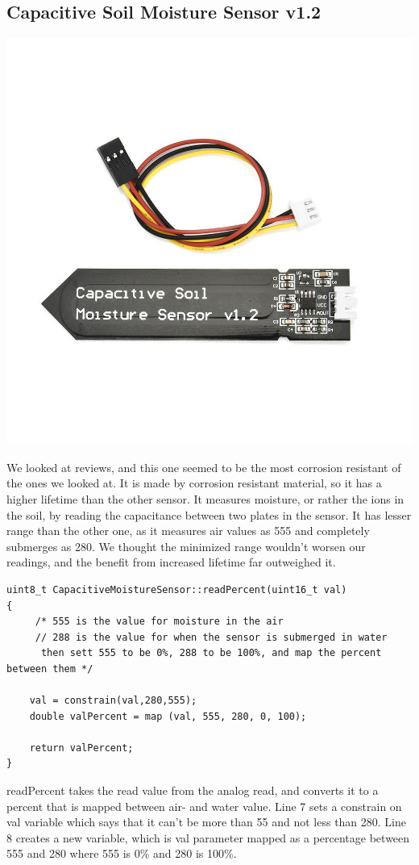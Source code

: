 \documentclass[a4paper,12pt,twoside,openright,titlepage]{book}
\begin{document}
\subsection{Capacitive Soil Moisture Sensor v1.2}
\begin{center}
\includegraphics[scale=0.20]{capacitive-sensor}
\end{center}

We looked at reviews, and this one seemed to be the most corrosion resistant of the ones we looked at. It is made by corrosion resistant material, so it has a higher lifetime than the other sensor. It measures moisture, or rather the ions in the soil, by reading the capacitance between two plates in the sensor. It has lesser range than the other one, as it measures air values as 555 and completely submerges as 280. We thought the minimized range wouldn't worsen our readings, and the benefit from increased lifetime far outweighed it.

\begin{lstlisting}[language=Arduino]
uint8_t CapacitiveMoistureSensor::readPercent(uint16_t val)
{
     /* 555 is the value for moisture in the air
	 // 288 is the value for when the sensor is submerged in water
	  then sett 555 to be 0%, 288 to be 100%, and map the percent between them */
	
	val = constrain(val,280,555);
	double valPercent = map (val, 555, 280, 0, 100);

	return valPercent;
}

\end{lstlisting}
readPercent takes the read value from the analog read, and converts it to a percent that is mapped between air- and water value. Line 7 sets a constrain on val variable which says that it can't be more than 55 and not less than 280. Line 8 creates a new variable, which is val parameter mapped as a percentage between 555 and 280 where 555 is 0\% and 280 is 100\%.
\end{document}
